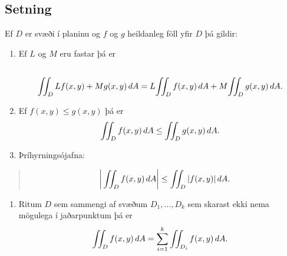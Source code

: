\documentclass[a4paper,10pt,icelandic]{sphinxmanual}
\begin{document}
\subsection{Setning}
\label{Kafli4:id5}
Ef \(D\) er svæði í planinu og \(f\) og \(g\) heildanleg
föll yfir \(D\) þá gildir:
\begin{enumerate}
\item {} 
Ef \(L\) og \(M\) eru fastar þá er
\begin{gather}
\begin{split}\displaystyle\end{split}\notag\\\begin{split}\int\!\!\!\int_D Lf(x,y)+Mg(x,y)\,dA=L\!\int\!\!\!\int_D f(x,y)\,dA+M\!\int\!\!\!\int_D
g(x,y)\,dA.\end{split}\notag
\end{gather}
\item {} 
Ef \(f(x,y)\leq g(x,y)\) þá er
\begin{gather}
\begin{split}\displaystyle \int\!\!\!\int_D f(x,y)\,dA\leq \int\!\!\!\int_Dg(x,y)\,dA.\end{split}\notag
\end{gather}
\item {} 
Þríhyrningsójafna:

\end{enumerate}
\begin{quote}
\begin{gather}
\begin{split}\bigg|\int\!\!\!\int_D f(x,y)\,dA\bigg|\leq \int\!\!\!\int_D |f(x,y)|\,dA.\end{split}\notag
\end{gather}\end{quote}
\begin{enumerate}
\item {} 
Ritum \(D\) sem sammengi af svæðum \(D_1,\ldots, D_k\) sem
skarast ekki nema mögulega í jaðarpunktum þá er
\begin{gather}
\begin{split}\displaystyle \int\!\!\!\int_D f(x,y)\,dA=\sum_{i=1}^k\int\!\!\!\int_{D_i}f(x,y)\,dA.\end{split}\notag
\end{gather}
\end{enumerate}
\end{document}
